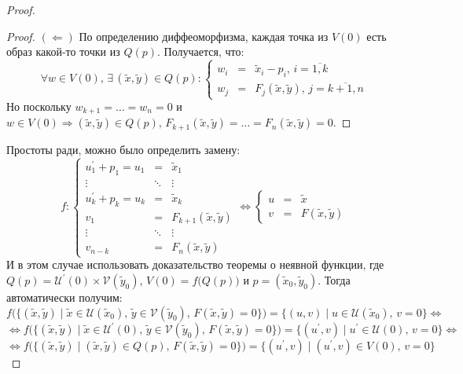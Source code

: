 \documentclass[12pt]{article}
\newcommand{\MU}{\mathcal{U}}
\newcommand{\MV}{\mathcal{V}}
\theoremstyle{definition}
\begin{document}
\begin{proof}
\begin{proof}
		$(\Leftarrow)$ По определению диффеоморфизма, каждая точка из $V(0)$ есть образ какой-то точки из $Q(p)$. Получается, что: 
		$$
			\forall w \in V(0), \, \exists \, (\widetilde{x},\widetilde{y}) \in Q(p) \colon \left\{
				\begin{array}{lcl}
					w_i& = &\widetilde{x}_i - p_i, \, i = \overline{1,k} \\
					w_j& = &F_j(\widetilde{x},\widetilde{y}), \, j = \overline{k+1,n}
				\end{array}
			\right.
		$$
		Но поскольку $w_{k+1} = \dotsc = w_n = 0$ и $w \in V(0) \Rightarrow (\widetilde{x},\widetilde{y}) \in Q(p), \, F_{k+1}(\widetilde{x},\widetilde{y}) = \dotsc = F_n(\widetilde{x},\widetilde{y}) = 0$.
	\end{proof}
	Простоты ради, можно было определить замену:
	$$
		f \colon \left\{
		\begin{array}{ccc}
			u^\prime_1 + p_1 = u_1 & = &\widetilde{x}_1 \\
			\vdots & \ddots & \vdots \\
			u^\prime_k + p_k = u_k & = &\widetilde{x}_k \\
			v_1& = &F_{k+1}(\widetilde{x},\widetilde{y}) \\
			\vdots & \ddots & \vdots \\
			v_{n-k}& = &F_n(\widetilde{x},\widetilde{y})
		\end{array}\right. \Leftrightarrow  
		\left\{
		\begin{array}{lcl}
			u& = &\widetilde{x} \\
			v& = &F(\widetilde{x},\widetilde{y})
		\end{array}\right.
	$$
	И в этом случае использовать доказательство теоремы о неявной функции, где $Q(p) = \MU^\prime(0) \times \MV(\widetilde{y}_0)$, $V(0) = f\big(Q(p)\big)$ и $p = (\widetilde{x}_0, \widetilde{y}_0)$. Тогда автоматически получим:
	$$
		f\big(\{(\widetilde{x},\widetilde{y}) \mid \widetilde{x} \in \MU(\widetilde{x}_0), \, \widetilde{y} \in \MV(\widetilde{y}_0), \, F(\widetilde{x},\widetilde{y}) = 0 \}\big) = \{(u,v) \mid u \in \MU(\widetilde{x}_0), \, v = 0 \} \Leftrightarrow
	$$
	$$
		 \Leftrightarrow f\big(\{(\widetilde{x},\widetilde{y}) \mid \widetilde{x} \in \MU^\prime(0), \, \widetilde{y} \in \MV(\widetilde{y}_0), \, F(\widetilde{x},\widetilde{y}) = 0 \}\big) = \{(u^\prime,v) \mid u^\prime \in \MU(0), \, v = 0 \} \Leftrightarrow
	$$
	$$
		\Leftrightarrow f\big(\{(\widetilde{x},\widetilde{y}) \mid (\widetilde{x},\widetilde{y}) \in Q(p), \, F(\widetilde{x},\widetilde{y}) = 0 \}\big) = \{(u^\prime,v) \mid (u^\prime,v) \in V(0), \, v = 0 \} 
	$$
	

\end{proof}
\end{document}
